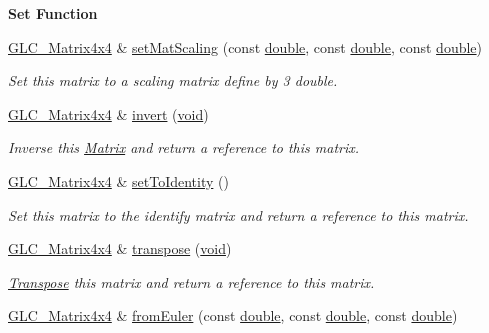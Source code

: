 \begin{Indent}{\bf Set Function}
\begin{DoxyCompactItemize}
\hyperlink{class_g_l_c___matrix4x4}{G\-L\-C\-\_\-\-Matrix4x4} \& \hyperlink{class_g_l_c___matrix4x4_a0fd12a34999368cba75e73523685977f}{set\-Mat\-Scaling} (const \hyperlink{_super_l_u_support_8h_a8956b2b9f49bf918deed98379d159ca7}{double}, const \hyperlink{_super_l_u_support_8h_a8956b2b9f49bf918deed98379d159ca7}{double}, const \hyperlink{_super_l_u_support_8h_a8956b2b9f49bf918deed98379d159ca7}{double})
\begin{DoxyCompactList}\small\item\em Set this matrix to a scaling matrix define by 3 double. \end{DoxyCompactList}\item 
\hyperlink{class_g_l_c___matrix4x4}{G\-L\-C\-\_\-\-Matrix4x4} \& \hyperlink{class_g_l_c___matrix4x4_a310aab7bcde7d8cbaa1ba4fe3e748e97}{invert} (\hyperlink{group___u_a_v_objects_plugin_ga444cf2ff3f0ecbe028adce838d373f5c}{void})
\begin{DoxyCompactList}\small\item\em Inverse this \hyperlink{class_matrix}{Matrix} and return a reference to this matrix. \end{DoxyCompactList}\item 
\hyperlink{class_g_l_c___matrix4x4}{G\-L\-C\-\_\-\-Matrix4x4} \& \hyperlink{class_g_l_c___matrix4x4_a76cb182cc8a19a48be7261ff252c9cd0}{set\-To\-Identity} ()
\begin{DoxyCompactList}\small\item\em Set this matrix to the identify matrix and return a reference to this matrix. \end{DoxyCompactList}\item 
\hyperlink{class_g_l_c___matrix4x4}{G\-L\-C\-\_\-\-Matrix4x4} \& \hyperlink{class_g_l_c___matrix4x4_a9982eae7a2b35c9d24640f76cfbd9628}{transpose} (\hyperlink{group___u_a_v_objects_plugin_ga444cf2ff3f0ecbe028adce838d373f5c}{void})
\begin{DoxyCompactList}\small\item\em \hyperlink{class_transpose}{Transpose} this matrix and return a reference to this matrix. \end{DoxyCompactList}\item 
\hyperlink{class_g_l_c___matrix4x4}{G\-L\-C\-\_\-\-Matrix4x4} \& \hyperlink{class_g_l_c___matrix4x4_a95debc51c190bc93f597b73a5a3d13b3}{from\-Euler} (const \hyperlink{_super_l_u_support_8h_a8956b2b9f49bf918deed98379d159ca7}{double}, const \hyperlink{_super_l_u_support_8h_a8956b2b9f49bf918deed98379d159ca7}{double}, const \hyperlink{_super_l_u_support_8h_a8956b2b9f49bf918deed98379d159ca7}{double})

\end{DoxyCompactItemize}
\end{Indent}
